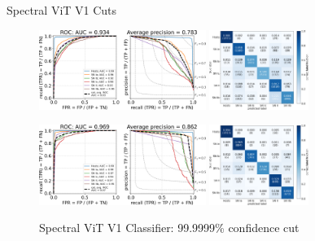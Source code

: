 \begin{frame}{Spectral ViT V1 Cuts}
    \begin{figure}[b]
        \centering
        \includegraphics[height=2.6cm]{figures/v1_real/vit_model_V1_original_redoroc99_e31.png}
        \quad
        \includegraphics[height=2.6cm]{figures/v1_real/vit_model_V1_original_redocm99_e31.png}
        \caption{Spectral ViT V1 Classifier: 99\% confidence cut \label{fig:v1_99_qual}}
        \includegraphics[height=2.6cm]{figures/v1_real/vit_model_V1_original_redoroc999999_e31.png}
        \quad
        \includegraphics[height=2.6cm]{figures/v1_real/vit_model_V1_original_redocm999999_e31.png}
        \caption{Spectral ViT V1 Classifier: 99.9999\% confidence cut \label{fig:v1_999999_qual}}
    \end{figure}
\end{frame}

